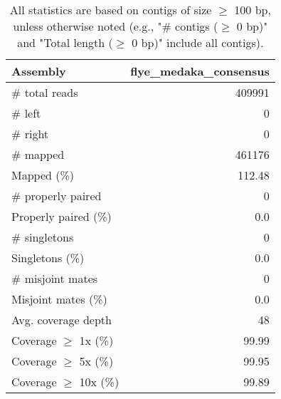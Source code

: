 \documentclass[12pt,a4paper]{article}
\begin{document}
\begin{table}[ht]
\begin{center}
\caption{All statistics are based on contigs of size $\geq$ 100 bp, unless otherwise noted (e.g., "\# contigs ($\geq$ 0 bp)" and "Total length ($\geq$ 0 bp)" include all contigs).}
\begin{tabular}{|l*{1}{|r}|}
\hline
Assembly & flye\_medaka\_consensus \\ \hline
\# total reads & 409991 \\ \hline
\# left & 0 \\ \hline
\# right & 0 \\ \hline
\# mapped & 461176 \\ \hline
Mapped (\%) & 112.48 \\ \hline
\# properly paired & 0 \\ \hline
Properly paired (\%) & 0.0 \\ \hline
\# singletons & 0 \\ \hline
Singletons (\%) & 0.0 \\ \hline
\# misjoint mates & 0 \\ \hline
Misjoint mates (\%) & 0.0 \\ \hline
Avg. coverage depth & 48 \\ \hline
Coverage $\geq$ 1x (\%) & 99.99 \\ \hline
Coverage $\geq$ 5x (\%) & 99.95 \\ \hline
Coverage $\geq$ 10x (\%) & 99.89 \\ \hline
\end{tabular}
\end{center}
\end{table}
\end{document}
